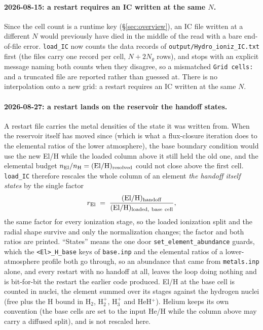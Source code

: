 \documentclass[english,a4paper]{my_memo}
\begin{document}
\paragraph{2026-08-15: a restart requires an IC written at the same $N$.}
Since the cell count is a runtime key (\S\ref{sec:overview}), an IC file
written at a different $N$ would previously have died in the middle of the
read with a bare end-of-file error. \texttt{load\_IC} now counts the data
records of \texttt{output/Hydro\_ioniz\_IC.txt} first (the files carry
one record per cell, $N + 2N_g$ rows), and stops with an explicit message
naming both counts when they disagree, so a mismatched
\texttt{Grid cells:} and a truncated file are reported rather than
guessed at. There is no interpolation onto a new grid: a restart requires
an IC written at the same $N$.

\paragraph{2026-08-27: a restart lands on the reservoir the handoff states.}
A restart file carries the metal densities of the state it was written from.
When the reservoir itself has moved since (which is what a flux-closure
iteration does to the elemental ratios of the lower atmosphere), the base
boundary condition would use the new El/H while the loaded column above it
still held the old one, and the elemental budget
$n_{\rm El}/n_{\rm H} = ({\rm El/H})_{\rm resolved}$ could not close above the
first cell. \texttt{load\_IC} therefore rescales the whole column of an element
\emph{the handoff itself states} by the single factor
\begin{equation}
r_{\rm El} \;=\;
  \frac{({\rm El/H})_{\rm handoff}}{({\rm El/H})_{\rm loaded,\ base\ cell}} ,
\end{equation}
the same factor for every ionization stage, so the loaded ionization split and
the radial shape survive and only the normalization changes; the factor and
both ratios are printed. ``States'' means the one door
\texttt{set\_element\_abundance} guards, which the \texttt{<El>\_H\_base} keys
of \texttt{base.inp} and the elemental ratios of a lower-atmosphere profile
both go through, so an abundance that came from \texttt{metals.inp} alone, and
every restart with no handoff at all, leaves the loop doing nothing and is
bit-for-bit the restart the earlier code produced. El/H at the base cell is
counted in nuclei, the element summed over its stages against the hydrogen
nuclei (free plus the H bound in H$_2$, H$_2^+$, H$_3^+$ and HeH$^+$). Helium
keeps its own convention (the base cells are set to the input He/H while the
column above may carry a diffused split), and is not rescaled here.
\end{document}
